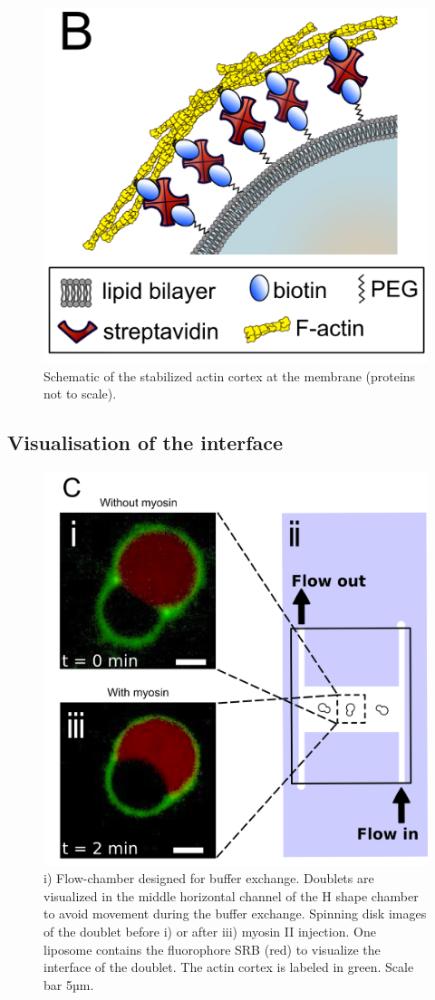 \documentclass[A4paperpaper,11pt,english]{sphinxmanual}
\begin{document}
\begin{figure}[htbp]
\centering
\capstart

\includegraphics[width=0.500\linewidth]{Fig_01-B.png}
\caption{Schematic of the stabilized actin cortex at the membrane (proteins not to scale).}\label{index-latex:fig1b}\end{figure}


\subsection{Visualisation of the interface}
\label{index-latex:visualisation-of-the-interface}\begin{figure}[htbp]
\centering
\capstart

\includegraphics[width=0.500\linewidth]{Fig_01-C.png}
\caption{i) Flow-chamber designed for buffer exchange. Doublets
are visualized in the middle horizontal channel of the H shape chamber to
avoid movement during the buffer exchange. Spinning disk images of the
doublet before i) or after iii) myosin II injection. One liposome contains the fluorophore
SRB (red) to visualize the interface of the doublet. The actin cortex is
labeled in green. Scale bar 5µm.}\label{index-latex:fig1c}\end{figure}
\end{document}
